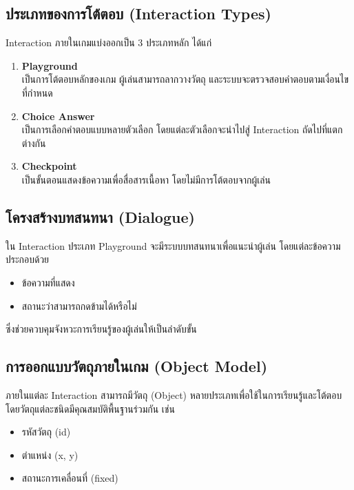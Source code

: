 \subsection{ประเภทของการโต้ตอบ (Interaction Types)}

Interaction ภายในเกมแบ่งออกเป็น 3 ประเภทหลัก ได้แก่

\begin{enumerate}
    \item \textbf{Playground} \\
    เป็นการโต้ตอบหลักของเกม ผู้เล่นสามารถลากวางวัตถุ และระบบจะตรวจสอบคำตอบตามเงื่อนไขที่กำหนด

    \item \textbf{Choice Answer} \\
    เป็นการเลือกคำตอบแบบหลายตัวเลือก โดยแต่ละตัวเลือกจะนำไปสู่ Interaction ถัดไปที่แตกต่างกัน

    \item \textbf{Checkpoint} \\
    เป็นขั้นตอนแสดงข้อความเพื่อสื่อสารเนื้อหา โดยไม่มีการโต้ตอบจากผู้เล่น
\end{enumerate}

\subsection{โครงสร้างบทสนทนา (Dialogue)}

ใน Interaction ประเภท Playground จะมีระบบบทสนทนาเพื่อแนะนำผู้เล่น โดยแต่ละข้อความประกอบด้วย

\begin{itemize}
    \item ข้อความที่แสดง
    \item สถานะว่าสามารถกดข้ามได้หรือไม่
\end{itemize}

ซึ่งช่วยควบคุมจังหวะการเรียนรู้ของผู้เล่นให้เป็นลำดับขั้น

\subsection{การออกแบบวัตถุภายในเกม (Object Model)}

ภายในแต่ละ Interaction สามารถมีวัตถุ (Object) หลายประเภทเพื่อใช้ในการเรียนรู้และโต้ตอบ โดยวัตถุแต่ละชนิดมีคุณสมบัติพื้นฐานร่วมกัน เช่น

\begin{itemize}
    \item รหัสวัตถุ (id)
    \item ตำแหน่ง (x, y)
    \item สถานะการเคลื่อนที่ (fixed)
\end{itemize}

